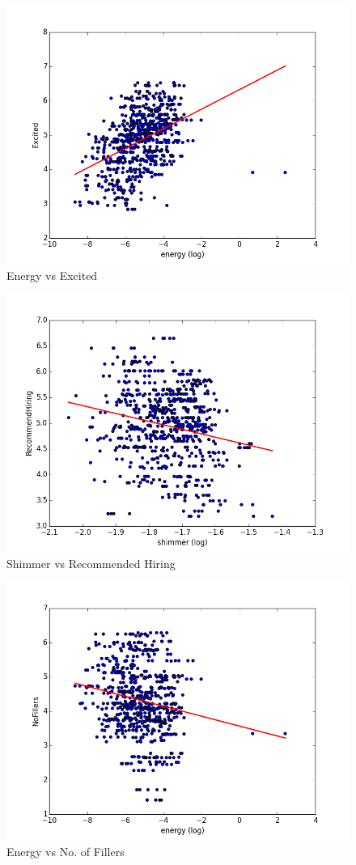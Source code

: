 \documentclass[11pt]{article}
\begin{document}
\begin{figure}[h!]
\begin{center}
\includegraphics[width=0.7\columnwidth]{figures/Excited and energy.png}
\caption{Energy vs Excited}
\label{fig:prosodic_analysis1}
\end{center}
\end{figure}


\begin{figure}[h!]
\begin{center}
\includegraphics[width=0.7\columnwidth]{figures/RecommendHiring and shimmer.png}
\caption{Shimmer vs Recommended Hiring}
\label{fig:prosodic_analysis2}
\end{center}
\end{figure}


\begin{figure}[h!]
\begin{center}
\includegraphics[width=0.7\columnwidth]{figures/NoFillers and energy.png}
\caption{Energy vs No. of Fillers}
\label{fig:prosodic_analysis3}
\end{center}
\end{figure}
\end{document}
